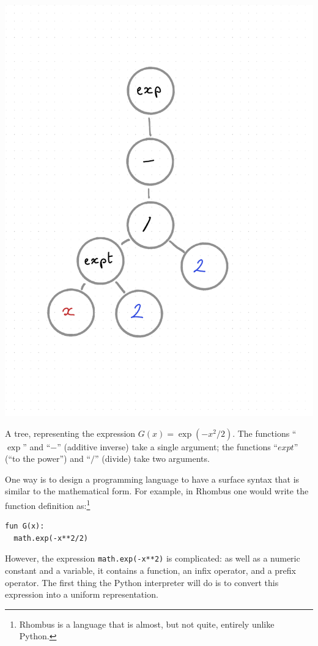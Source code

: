 \documentclass[11pt, a4paper]{article}
\begin{document}
\begin{marginfigure}
  \centering
  \includegraphics[width=0.8\marginparwidth]{images/expr-gauss.pdf}
  \caption{A tree, representing the expression $G(x) =
    \exp(-x^2/2)$. The functions ``$\exp$'' and ``$-$'' (additive
    inverse) take a single argument; the functions ``$expt$'' (``to
    the power'') and ``$/$'' (divide) take two
    arguments.\label{fig:expression-tree-gaussian}}
\end{marginfigure}
One way is to design a programming language to have a surface syntax
that is similar to the mathematical form. For example, in Rhombus one
would write the function definition as:\footnote{Rhombus is a language
  that is almost, but not quite, entirely unlike Python.}
\begin{verbatim}
fun G(x):
  math.exp(-x**2/2)
\end{verbatim}
However, the expression \texttt{math.exp(-x**2)} is
complicated: as well as a numeric constant and a variable, it contains
a function, an infix operator, and a prefix operator. The first thing
the Python interpreter will do is to convert this expression into a
uniform representation.
\end{document}
